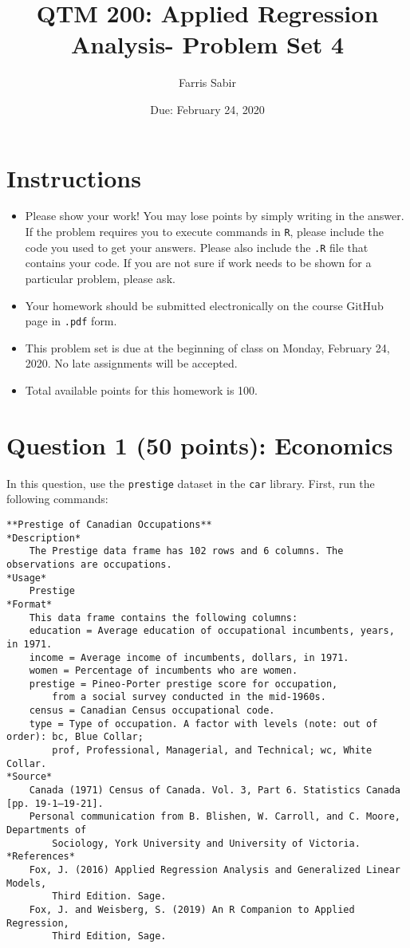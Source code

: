 \documentclass[12pt,letterpaper]{article}
\title{QTM 200: Applied Regression Analysis- Problem Set 4}
\date{Due: February 24, 2020}
\author{Farris Sabir}
\begin{document}
	\maketitle
	
	\section*{Instructions}
	\begin{itemize}
		\item Please show your work! You may lose points by simply writing in the answer. If the problem requires you to execute commands in \texttt{R}, please include the code you used to get your answers. Please also include the \texttt{.R} file that contains your code. If you are not sure if work needs to be shown for a particular problem, please ask.
		\item Your homework should be submitted electronically on the course GitHub page in \texttt{.pdf} form.
		\item This problem set is due at the beginning of class on Monday, February 24, 2020. No late assignments will be accepted.
		\item Total available points for this homework is 100.
	\end{itemize}

	\vspace{.5cm}
\section*{Question 1 (50 points): Economics}
\vspace{.25cm}
\noindent 	
In this question, use the \texttt{prestige} dataset in the \texttt{car} library. First, run the following commands:

  

\begin{verbatim}
**Prestige of Canadian Occupations**
*Description*
	The Prestige data frame has 102 rows and 6 columns. The observations are occupations.
*Usage*
	Prestige
*Format*
	This data frame contains the following columns:
	education = Average education of occupational incumbents, years, in 1971.
	income = Average income of incumbents, dollars, in 1971.
	women = Percentage of incumbents who are women.
	prestige = Pineo-Porter prestige score for occupation, 
		from a social survey conducted in the mid-1960s.
	census = Canadian Census occupational code.
	type = Type of occupation. A factor with levels (note: out of order): bc, Blue Collar; 
		prof, Professional, Managerial, and Technical; wc, White Collar.
*Source*
	Canada (1971) Census of Canada. Vol. 3, Part 6. Statistics Canada [pp. 19-1–19-21].
	Personal communication from B. Blishen, W. Carroll, and C. Moore, Departments of 
		Sociology, York University and University of Victoria.
*References*
	Fox, J. (2016) Applied Regression Analysis and Generalized Linear Models, 
		Third Edition. Sage.
	Fox, J. and Weisberg, S. (2019) An R Companion to Applied Regression, 
		Third Edition, Sage.

\end{verbatim} 
\end{document}
